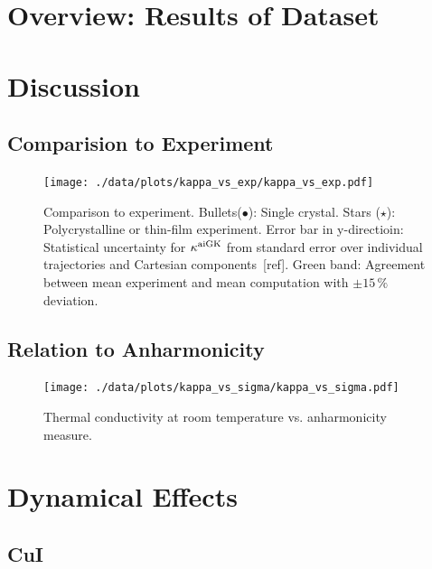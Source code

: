 \section{Overview: Results of Dataset}
\section{Discussion}
\subsection{Comparision to Experiment}

\begin{figure}
	\texttt{[image: ./data/plots/kappa\_vs\_exp/kappa\_vs\_exp.pdf]}
	\caption{Comparison to experiment. Bullets($\bullet$): Single crystal. Stars ($\star$): Polycrystalline or thin-film experiment. Error bar in y-directioin: Statistical uncertainty for $\kappa^{\rm aiGK}$ from standard error over individual trajectories and Cartesian components~[ref]. Green band: Agreement between mean experiment and mean computation with $\pm 15\,\%$ deviation.}
	\label{fig:kappa_exp}
\end{figure}

\subsection{Relation to Anharmonicity}

\begin{figure}
	\texttt{[image: ./data/plots/kappa\_vs\_sigma/kappa\_vs\_sigma.pdf]}
	\caption{Thermal conductivity at room temperature vs. anharmonicity measure.}
	\label{fig:kappa_sigma}
\end{figure}

\section{Dynamical Effects}

\subsection{CuI}

